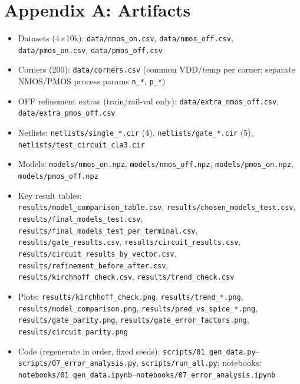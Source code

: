\documentclass[11pt,a4paper]{article}
\begin{document}
\section*{Appendix A: Artifacts}
\begin{itemize}[leftmargin=*]
\item Datasets (4$\times$10k): \texttt{data/nmos\_on.csv}, \texttt{data/nmos\_off.csv}, \texttt{data/pmos\_on.csv}, \texttt{data/pmos\_off.csv}
\item Corners (200): \texttt{data/corners.csv} (common VDD/temp per corner; separate NMOS/PMOS process params \texttt{n\_*}, \texttt{p\_*})
\item OFF refinement extras (train/rail-val only): \texttt{data/extra\_nmos\_off.csv}, \texttt{data/extra\_pmos\_off.csv}
\item Netlists: \texttt{netlists/single\_*.cir} (4), \texttt{netlists/gate\_*.cir} (5), \texttt{netlists/test\_circuit\_cla3.cir}
\item Models: \texttt{models/nmos\_on.npz}, \texttt{models/nmos\_off.npz}, \texttt{models/pmos\_on.npz}, \texttt{models/pmos\_off.npz}
\item Key result tables:\\
\texttt{results/model\_comparison\_table.csv}, \texttt{results/chosen\_models\_test.csv},\\
\texttt{results/final\_models\_test.csv}, \texttt{results/final\_models\_test\_per\_terminal.csv},\\
\texttt{results/gate\_results.csv}, \texttt{results/circuit\_results.csv},\\
\texttt{results/circuit\_results\_by\_vector.csv}, \texttt{results/refinement\_before\_after.csv},\\
\texttt{results/kirchhoff\_check.csv}, \texttt{results/trend\_check.csv}
\item Plots: \texttt{results/kirchhoff\_check.png}, \texttt{results/trend\_*.png}, \texttt{results/model\_comparison.png}, \texttt{results/pred\_vs\_spice\_*.png}, \texttt{results/gate\_parity.png}, \texttt{results/gate\_error\_factors.png}, \texttt{results/circuit\_parity.png}
\item Code (regenerate in order, fixed seeds): \texttt{scripts/01\_gen\_data.py}--\texttt{scripts/07\_error\_analysis.py}, \texttt{scripts/run\_all.py}; notebooks: \texttt{notebooks/01\_gen\_data.ipynb}--\texttt{notebooks/07\_error\_analysis.ipynb}
\end{itemize}
\end{document}
